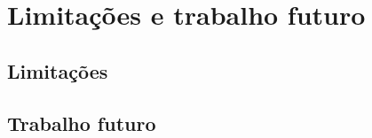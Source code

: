 \chapter{Limitações e trabalho futuro}
\label{cap:limitacoes}

\section{Limitações}


\section{Trabalho futuro}


